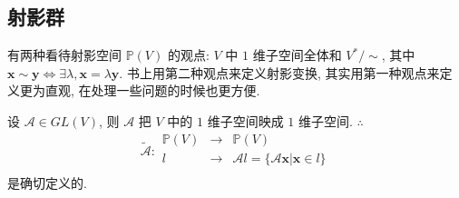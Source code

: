\documentclass[color=black,device=normal,lang=cn,mode=geye]{elegantnote}
\begin{document}
\subsection{射影群}
有两种看待射影空间 $\mathbb{P}(V)$ 的观点: $V$ 中 $1$ 维子空间全体和 $V^*/\sim$, 其中 $\boldsymbol{x}\sim\boldsymbol{y}\Leftrightarrow\exists\lambda,\boldsymbol{x}=\lambda\boldsymbol{y}$. 书上用第二种观点来定义射影变换, 其实用第一种观点来定义更为直观, 在处理一些问题的时候也更方便.

设 $\mathcal{A}\in GL (V)$, 则 $\mathcal{A}$ 把 $V$ 中的 $1$ 维子空间映成 $1$ 维子空间. $\therefore$
\[\widetilde{\mathcal{A}}:\begin{array}{rcl}
    \mathbb{P}(V) & \to & \mathbb{P}(V) \\
    l & \to & \mathcal{A}l=\{\mathcal{A}\boldsymbol{x}|\boldsymbol{x}\in l\} \\
\end{array}\]
是确切定义的.
\end{document}

